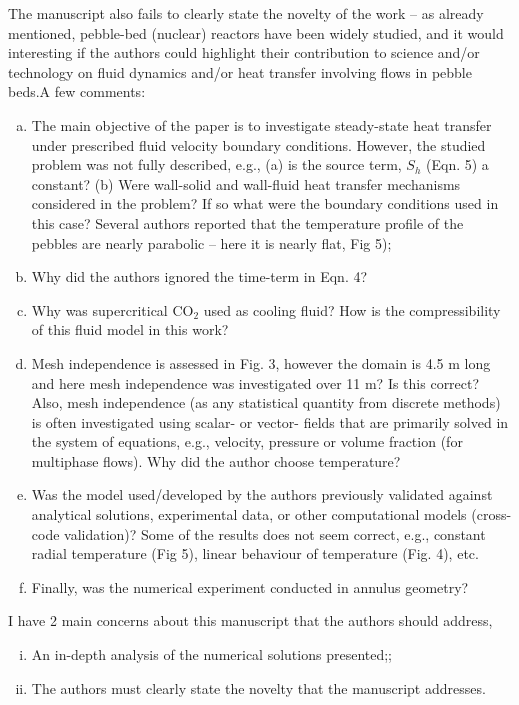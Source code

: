 \documentclass[14pt,twoside]{report}
\begin{document}
The manuscript also fails to clearly state the novelty of the work -- as already mentioned, pebble-bed (nuclear) reactors have been widely studied, and it would interesting if the authors could highlight their contribution to science and/or technology on fluid dynamics and/or heat transfer involving flows in pebble beds.A few comments:
\begin{enumerate}[(a)] 
%
\item  The main objective of the paper is to investigate steady-state heat transfer under prescribed fluid velocity boundary conditions. However, the studied problem was not fully described, e.g., (a) is the source term, $S_{h}$ (Eqn. 5) a constant? (b) Were wall-solid and wall-fluid heat transfer mechanisms considered in the problem? If so what were the boundary conditions used in this case? Several authors reported that the temperature profile of the pebbles are nearly parabolic -- here it is nearly flat, Fig 5);
%
\item Why did the authors ignored the time-term in Eqn. 4?
%
\item Why was supercritical CO$_{2}$ used as cooling fluid? How is the compressibility of this fluid model in this work?
%
\item Mesh independence is assessed in Fig. 3, however the domain is 4.5 m long and here mesh independence was investigated over 11 m? Is this correct? Also, mesh independence (as any statistical quantity from discrete methods) is often investigated using scalar- or vector- fields that are primarily solved in the system of equations, e.g., velocity, pressure or volume fraction (for multiphase flows). Why did the author choose temperature?
%
\item Was the model used/developed by the authors previously validated against analytical solutions, experimental data, or other computational models (cross-code validation)? Some of the results does not seem correct, e.g., constant radial temperature (Fig 5), linear behaviour of temperature (Fig. 4), etc. 
%
\item Finally, was the numerical experiment conducted in annulus geometry?
%
\end{enumerate}
I have 2 main concerns about this manuscript that the authors should address,
\begin{enumerate}[(i)]
\item An in-depth analysis of the numerical solutions presented;;
\item The authors must clearly state the novelty that the manuscript addresses.
\end{enumerate}
\end{document}
